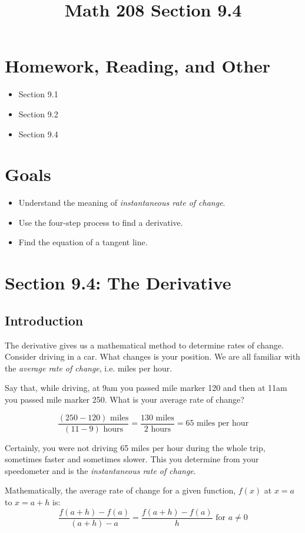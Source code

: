 \documentclass[14pt]{extarticle}
\title{\vspace{-5ex}Math 208 Section 9.4}
\date{\vspace{-10ex}}
\begin{document}
	\maketitle		
	\section*{Homework, Reading, and Other}
	\begin{itemize}
		\item Section 9.1
		\item Section 9.2
		\item Section 9.4
	\end{itemize}

	\section{Goals}
	\begin{itemize}
		\item Understand the meaning of \textit{instantaneous rate of change}.
		\item Use the four-step process to find a derivative.
		\item Find the equation of a tangent line.
	\end{itemize}
		
\section{Section 9.4: The Derivative}
\subsection{Introduction} The derivative gives us a mathematical method to determine rates of change. Consider driving in a car. What changes is your position. We are all familiar with the \textit{average rate of change}, i.e. miles per hour.

Say that, while driving, at 9am you passed mile marker 120 and then at 11am you passed mile marker 250. What is your average rate of change?

$$\frac{(250-120)\text{ miles}}{(11-9)\text{ hours}}= \frac{130 \text{ miles}}{2 \text{ hours}}= 65 \text{ miles per hour}$$

Certainly, you were not driving 65 miles per hour during the whole trip, sometimes faster and sometimes slower. This you determine from your speedometer and is the \textit{instantaneous rate of change}.

Mathematically, the average rate of change for a given function, $f(x)$ at $x=a$ to $x=a+h$ is:
$$\frac{f(a+h)-f(a)}{(a+h)-a} = \frac{f(a+h)-f(a)}{h} \text{ for }a\neq 0$$
\end{document}
